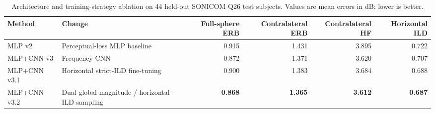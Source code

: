 \begin{table}[t]
\centering
\caption{Architecture and training-strategy ablation on 44 held-out SONICOM Q26 test subjects. Values are mean errors in dB; lower is better.}
\label{tab:sonicom-ablation}
\begin{tabular}{lp{5.2cm}rrrr}
\toprule
Method & Change & Full-sphere ERB & Contralateral ERB & Contralateral HF & Horizontal ILD \\
\midrule
MLP v2 & Perceptual-loss MLP baseline & 0.915 & 1.431 & 3.895 & 0.722 \\
MLP+CNN v3 & Frequency CNN & 0.872 & 1.371 & 3.620 & 0.707 \\
MLP+CNN v3.1 & Horizontal strict-ILD fine-tuning & 0.900 & 1.383 & 3.684 & 0.688 \\
MLP+CNN v3.2 & Dual global-magnitude / horizontal-ILD sampling & \textbf{0.868} & \textbf{1.365} & \textbf{3.612} & \textbf{0.687} \\
\bottomrule
\end{tabular}
\end{table}
